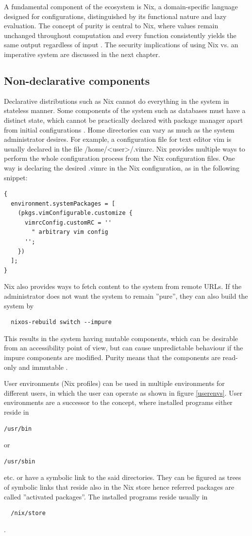 A fundamental component of the ecosystem is Nix, a domain-specific
language designed for configurations, distinguished by its functional
nature and lazy evaluation. The concept of purity is central to Nix,
where values remain unchanged throughout computation and every
function consistently yields the same output regardless of input
\cite{dolstra2013charon}. The security implications of using Nix
vs. an imperative system are discussed in the next chapter.

\subsection{Non-declarative components} \label{nondeclarative}

Declarative distributions such as Nix cannot do everything in the
system in stateless manner. Some components of the system such as
databases must have a distinct state, which cannot be practically
declared with package manager apart from initial configurations
\cite{van2013reference}. Home directories can vary as much as the
system administrator desires. For example, a configuration file for
text editor vim is usually declared in the file
/home/<user>/.vimrc. Nix provides multiple ways to perform the whole
configuration process from the Nix configuration files. One way is
declaring the desired .vimrc in the Nix configuration, as in the
following snippet:

\begin{lstlisting}
{
  environment.systemPackages = [
    (pkgs.vimConfigurable.customize {
      vimrcConfig.customRC = ''
        " arbitrary vim config
      '';
    })
  ];
}
\end{lstlisting}
Nix also provides ways to fetch content to the system from
remote URLs. If the administrator does not want the system to
remain ''pure'', they can also build the system by
\begin{lstlisting}
  nixos-rebuild switch --impure
\end{lstlisting}
This results in the system having mutable components, which can be
desirable from an accessibility point of view, but can cause
unpredictable behaviour if the impure components are modified. Purity means that the components are read-only and
immutable \cite{dolstra2010nixos}.

User environments (Nix profiles) can be used in multiple environments for different users, in which the user can operate as shown in figure  \ref{userenvs}. User
environments are a successor to the concept, where installed programs
either reside in
\begin{lstlisting}
/usr/bin
\end{lstlisting}
or
\begin{lstlisting}
/usr/sbin
\end{lstlisting}
etc. or have a symbolic link to
the said directories. They can be figured as trees of symbolic links
that reside also in the Nix store hence referred packages are called
''activated packages''. The installed programs reside usually in
\begin{lstlisting}
  /nix/store
\end{lstlisting} \cite{dolstra2008nixos}.

